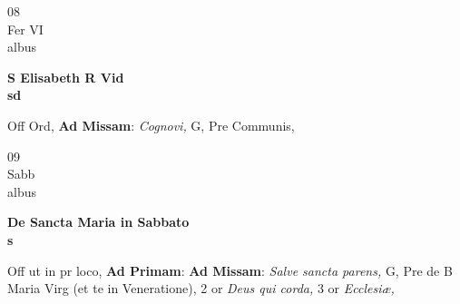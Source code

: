 \documentclass[10pt, openany]{book}
\begin{document}
        \begin{center}
            \begin{minipage}{3.5in}
                \vspace{2em}
                \begin{minipage}{0.5in}
                    {\Huge 08} \\
                    {\normalsize Fer VI} \\
                    {\normalsize albus}
                \end{minipage}
                \begin{minipage}{3.0in}
                    \textbf{ \large S Elisabeth R Vid \\
                    \textnormal{\normalsize sd}} \\ 
                \end{minipage}
                \begin{justify}Off Ord, \textbf{Ad Missam}: \textit{Cognovi,} G, Pre Communis,   
                \end{justify}
            \end{minipage}
        \end{center}
    
        \begin{center}
            \begin{minipage}{3.5in}
                \vspace{2em}
                \begin{minipage}{0.5in}
                    {\Huge 09} \\
                    {\normalsize Sabb} \\
                    {\normalsize albus}
                \end{minipage}
                \begin{minipage}{3.0in}
                    \textbf{ \large De Sancta Maria in Sabbato \\
                    \textnormal{\normalsize s}} \\ 
                \end{minipage}
                \begin{justify}Off ut in pr loco, \textbf{Ad Primam}: \textbf{Ad Missam}: \textit{Salve sancta parens,} G, Pre de B Maria Virg (et te in Veneratione), 2 or \textit{Deus qui corda,} 3 or \textit{Ecclesiæ,}   
                \end{justify}
            \end{minipage}
        \end{center}
    
\end{document}

